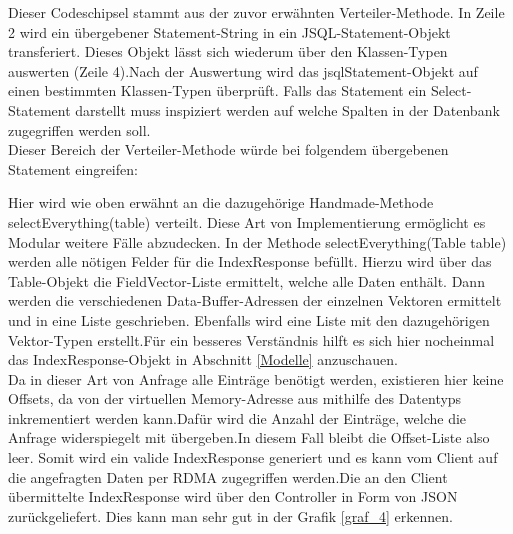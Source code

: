 Dieser Codeschipsel stammt aus der zuvor erwähnten Verteiler-Methode. In Zeile 2  wird ein übergebener Statement-String in ein JSQL-Statement-Objekt transferiert. Dieses Objekt lässt sich wiederum über den Klassen-Typen auswerten (Zeile 4).Nach der Auswertung wird das jsqlStatement-Objekt auf einen bestimmten Klassen-Typen überprüft. Falls das Statement ein Select-Statement darstellt muss inspiziert werden auf welche Spalten in der Datenbank zugegriffen werden soll.\\ 
Dieser Bereich der Verteiler-Methode würde bei folgendem übergebenen Statement eingreifen:

\begin{center}
\end{center}

Hier wird wie oben erwähnt an die dazugehörige Handmade-Methode selectEverything(table) verteilt. Diese Art von Implementierung ermöglicht es Modular weitere Fälle abzudecken.
In der Methode selectEverything(Table table) werden alle nötigen Felder für die IndexResponse befüllt. Hierzu wird über das Table-Objekt die FieldVector-Liste ermittelt, welche alle Daten enthält. Dann werden die verschiedenen Data-Buffer-Adressen der einzelnen Vektoren ermittelt und in eine Liste geschrieben. Ebenfalls wird eine Liste mit den dazugehörigen Vektor-Typen erstellt.Für ein besseres Verständnis hilft es sich hier nocheinmal das IndexResponse-Objekt in Abschnitt \ref{Modelle} anzuschauen.\\
Da in dieser Art von Anfrage alle Einträge benötigt werden, existieren hier keine Offsets, da von der virtuellen Memory-Adresse aus mithilfe des Datentyps inkrementiert werden kann.Dafür wird die Anzahl der Einträge, welche die Anfrage widerspiegelt mit übergeben.In diesem Fall bleibt die Offset-Liste also leer.
Somit wird ein valide IndexResponse generiert und es kann vom Client auf die angefragten Daten per RDMA zugegriffen werden.Die an den Client übermittelte IndexResponse wird über den Controller in Form von JSON zurückgeliefert. Dies kann man sehr gut in der Grafik \ref{graf_4} erkennen.

